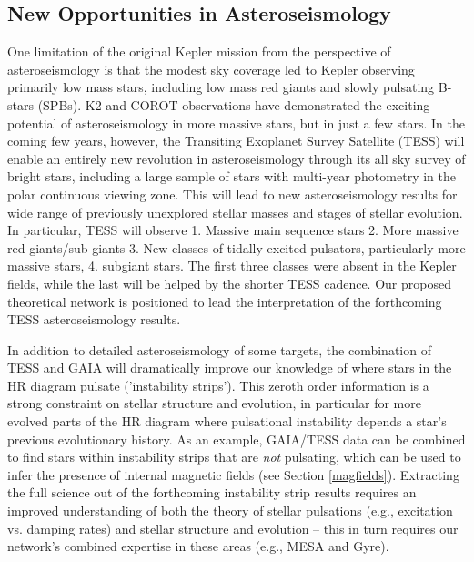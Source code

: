 \subsection{New Opportunities in Asteroseismology}

One limitation of the original Kepler mission from the perspective of asteroseismology is that the modest sky coverage led to Kepler observing primarily low mass stars, including low mass red giants and slowly pulsating B-stars (SPBs).  K2 and COROT observations have demonstrated the exciting potential of asteroseismology in more massive stars, but in just a few stars.   In the coming few years, however, the Transiting Exoplanet Survey Satellite (TESS) will enable an entirely new revolution in asteroseismology through its all sky survey of bright stars, including a large sample of stars with multi-year photometry in the polar continuous viewing zone. This will lead to new asteroseismology results for wide range of previously unexplored stellar masses and stages of stellar evolution. In particular, TESS will observe 1.  Massive main sequence stars 2. More massive red giants/sub giants {\color{green} 3. New classes of tidally excited pulsators, particularly more massive stars}, 4. subgiant stars. The first three classes were absent in the Kepler fields, while the last will be helped by the shorter TESS cadence. {\color{green} Our proposed theoretical network is positioned to lead the interpretation of the forthcoming TESS asteroseismology results.}

In addition to detailed asteroseismology of some targets, the combination of TESS and GAIA will dramatically improve our knowledge of where stars in the HR diagram pulsate ('instability strips').  This zeroth order information is  a strong constraint on stellar structure and evolution, in particular for more evolved parts of the HR diagram where pulsational instability depends a star's previous evolutionary history. As an example, GAIA/TESS data can be combined to find stars within instability strips that are {\it not} pulsating, which can be used to infer the presence of internal magnetic fields (see Section \ref{magfields}). Extracting the full science out of the forthcoming instability strip results requires an improved understanding of both the theory of stellar pulsations (e.g., excitation vs. damping rates) and stellar structure and evolution -- this in turn requires our network's combined expertise in these areas (e.g., MESA and Gyre).
